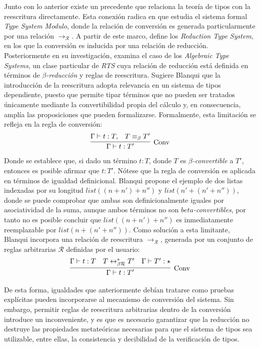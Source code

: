Junto con lo anterior existe un precedente que relaciona la teoría de tipos con la reescritura directamente. Esta conexión radica en que \cite{blanqui} estudia el sistema formal \textit{Type System Modulo}, donde la relación de conversión es generada particularmente por una relación $\to_\mathcal{R}$. A partir de este marco, define los \textit{Reduction Type System}, en los que la conversión es inducida por una relación de reducción. Posteriormente en su investigación, examina el caso de los \textit{Algebraic Type Systems}, un clase particular de \textit{RTS} cuya relación de reducción está definida en términos de \textit{$\beta$-reducción} y reglas de reescritura. Sugiere Blanqui que la introducción de la reescritura adopta relevancia en un sistema de tipos dependiente, puesto que permite tipar términos que no pueden ser tratados únicamente mediante la convertibilidad propia del cálculo y, en consecuencia, amplía las proposiciones que pueden formalizarse. Formalmente, esta limitación se refleja en la regla de conversión:
\begin{gather}
  \infer[\text{Conv}]
  {\Gamma \vdash t : T'}
  {\Gamma \vdash t : T, & T \equiv_\beta T'}
\end{gather}
Donde se establece que, si dado un término $t : T$, donde $T$ es \textit{$\beta$-convertible} a $T'$, entonces es posible afirmar que $t: T'$. Nótese que la regla de conversión es aplicada en términos de igualdad definicional. Blanqui propone el ejemplo de dos listas indexadas por su longitud $list((n + n') + n'')$ y $list(n' + (n' + n''))$, donde se puede comprobar que ambas son definicionalmente iguales por asociatividad de la suma, aunque ambos términos no son \textit{$beta$-convertibles}, por tanto no es posible concluir que $list((n +  n') + n'')$ es inmediatamente reemplazable por $list(n + (n' + n''))$. Como solución a esta limitante, Blanqui incorpora una relación de reescritura $\to_\mathcal{R}$, generada por un conjunto de reglas arbitrarias $\mathcal{R}$ definidas por el usuario:
\begin{gather}
  \infer[\text{Conv}]
  {\Gamma \vdash t : T'}
  {
    \Gamma \vdash t : T
    &
    T \leftrightarrow_{\beta\mathcal{R}}^{*} T'
    &
    \Gamma \vdash T' : \star
  }
\end{gather}

De esta forma, igualdades que anteriormente debían tratarse como pruebas explícitas pueden incorporarse al mecanismo de conversión del sistema. Sin embargo, permitir reglas de reescritura arbitrarias dentro de la conversión introduce un inconveniente, y es que es necesario garantizar que la reducción no destruye las propiedades metateóricas necesarias para que el sistema de tipos sea utilizable, entre ellas, la consistencia y decibilidad de la verificación de tipos.

